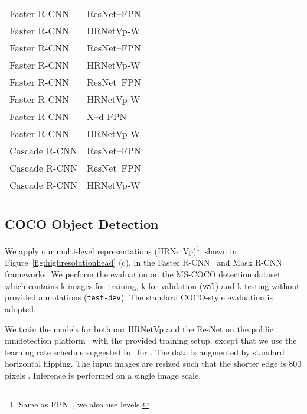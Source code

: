 \documentclass[10pt,twocolumn,letterpaper]{article}
\begin{document}
\begin{table*}[ht]
\begin{tabular}{l|lcr|ccc|ccc}
	    \hline
        Faster R-CNN \cite{LinDGHHB17} & ResNet--FPN &  &  &  &  &  &  &  &  \\
        Faster R-CNN & HRNetVp-W &  &  &  &  &  &  &  &   \\\arrayrulecolor{gray}\hline\arrayrulecolor{black}
		Faster R-CNN \cite{LinDGHHB17} & ResNet--FPN &  &  &  &  &  &  &  &  \\
		Faster R-CNN & HRNetVp-W &  &   &  &  &  &  &  &  \\	
		\arrayrulecolor{gray}\hline\arrayrulecolor{black}
		Faster R-CNN \cite{LinDGHHB17} & ResNet--FPN &  &  &  &  &  &  &  &  \\
		Faster R-CNN & HRNetVp-W &  &   &  &  &  &  &  &  \\
		\arrayrulecolor{gray}\hline\arrayrulecolor{black}
	    Faster R-CNN \cite{mmdetection2018} & X--d-FPN &  &  &  &  &  &  &  &  \\
		Faster R-CNN & HRNetVp-W &   &  &  &  &  &  &  &  \\

	
	   \arrayrulecolor{gray}\hline\arrayrulecolor{black}
	    Cascade R-CNN \cite{CaiV18} & ResNet--FPN &  &  &  &  &   &  &  &  \\
	    Cascade R-CNN & ResNet--FPN &  &  &  &  &  &  &  &  \\
	    Cascade R-CNN & HRNetVp-W  &  &  &  &  &  &  &  &  \\
		\arrayrulecolor{black}\hline
	\end{tabular}
	\end{table*}

\subsection{COCO Object Detection}
We apply our multi-level representations (HRNetVp)\footnote{Same as FPN~\cite{LinGGHD17},
we also use  levels.},
shown in Figure~\ref{fig:highresolutionhead} (c),
in the Faster R-CNN~\cite{RenHG015} and Mask R-CNN~\cite{HeGDG17} frameworks.
We perform the evaluation on the MS-COCO  detection dataset,
which contains k images for training,
k for validation (\texttt{val}) and k testing without provided annotations (\texttt{test-dev}).
The standard COCO-style evaluation is adopted.

We train the models for both our HRNetVp and the ResNet
on the public mmdetection platform~\cite{mmdetection2018}
with the provided training setup,
except that we use the learning rate schedule suggested in~\cite{DBLP:journals/corr/abs-1811-08883}
for .
The data is augmented
by standard horizontal flipping. The input images are resized such that the shorter edge is 800 pixels \cite{LinDGHHB17}.
Inference is performed on a single image scale.
\end{document}
